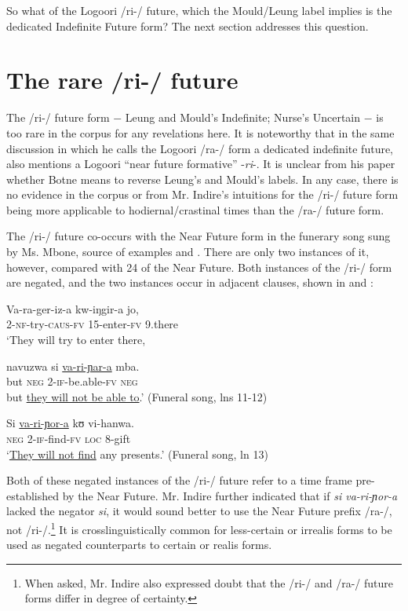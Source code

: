 \documentclass[output=paper]{langsci/langscibook}
\begin{document}
So what of the Logoori /ri-/ future, which the Mould/Leung label implies is the dedicated Indefinite Future form? The next section addresses this question.

\section[The rare /ri{}-/ future]{The rare /ri-/ future}
\label{sec:sarvasy:4}

The /ri-/ future form $-$ Leung and Mould’s Indefinite; Nurse’s Uncertain $-$ is too rare in the corpus for any revelations here. It is noteworthy that in the same discussion in which he calls the Logoori /ra-/ form a dedicated indefinite future, \citet[491]{Botne1999} also mentions a Logoori “near future formative” -\textit{ri}{}-. It is unclear from his paper whether Botne means to reverse Leung’s and Mould’s labels. In any case, there is no evidence in the corpus or from Mr. Indire’s intuitions for the /ri-/ future form being more applicable to hodiernal/crastinal times than the /ra-/ future form.

The /ri-/ future co-occurs with the Near Future form in the funerary song sung by Ms. Mbone, source of examples  and . There are only two instances of it, however, compared with 24 of the Near Future. Both instances of the /ri-/ form are negated, and the two instances occur in adjacent clauses, shown in  and :

\ea\label{ex:sarvasy:9}
\gll Va-ra-ger-iz-a     kw-iŋgir-a   jo,\\ 
2-\textsc{nf}{}-try\textsc{{}-caus-fv}  15-enter-\textsc{fv}  9.there\\ 
\glt ‘They will try to enter there,

\gll navuzwa   si   \underline{va-ri-ɲar-a}     mba. \\
but    \textsc{neg}  2-\textsc{if-}be.able-\textsc{fv}  \textsc{neg} \\
\glt but \underline{they will not be able to}.’ (Funeral song, lns 11-12)
\z

\ea\label{ex:sarvasy:10}
\gll Si   \underline{va-ri-ɲor-a}   kʊ   vi-hanwa. \\
\textsc{neg}  2-\textsc{if-}find-\textsc{fv}  \textsc{loc}  8-gift \\
\glt ‘\underline{They will not find} any presents.’ (Funeral song, ln 13)
\z

Both of these negated instances of the /ri-/ future refer to a time frame pre-established by the Near Future. Mr. Indire further indicated that if \textit{si va-ri-ɲor-a }lacked the negator \textit{si}, it would sound better to use the Near Future prefix /ra-/, not /ri-/.\footnote{ When asked, Mr. Indire also expressed doubt that the /ri-/ and /ra-/ future forms differ in degree of certainty.} It is crosslinguistically common for less-certain or irrealis forms to be used as negated counterparts to certain or realis forms. 
\end{document}
